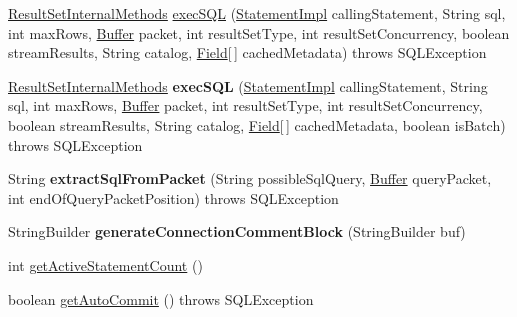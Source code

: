 \begin{DoxyCompactItemize}
\item 
\mbox{\hyperlink{interfacecom_1_1mysql_1_1jdbc_1_1_result_set_internal_methods}{Result\+Set\+Internal\+Methods}} \mbox{\hyperlink{classcom_1_1mysql_1_1jdbc_1_1_connection_impl_ad757f25d671446b4bf4eec638de7ddce}{exec\+S\+QL}} (\mbox{\hyperlink{classcom_1_1mysql_1_1jdbc_1_1_statement_impl}{Statement\+Impl}} calling\+Statement, String sql, int max\+Rows, \mbox{\hyperlink{classcom_1_1mysql_1_1jdbc_1_1_buffer}{Buffer}} packet, int result\+Set\+Type, int result\+Set\+Concurrency, boolean stream\+Results, String catalog, \mbox{\hyperlink{classcom_1_1mysql_1_1jdbc_1_1_field}{Field}}\mbox{[}$\,$\mbox{]} cached\+Metadata)  throws S\+Q\+L\+Exception 
\item 
\mbox{\label{classcom_1_1mysql_1_1jdbc_1_1_connection_impl_a4c153e32d07757c63a3000d5775b94a8}} 
\mbox{\hyperlink{interfacecom_1_1mysql_1_1jdbc_1_1_result_set_internal_methods}{Result\+Set\+Internal\+Methods}} {\bfseries exec\+S\+QL} (\mbox{\hyperlink{classcom_1_1mysql_1_1jdbc_1_1_statement_impl}{Statement\+Impl}} calling\+Statement, String sql, int max\+Rows, \mbox{\hyperlink{classcom_1_1mysql_1_1jdbc_1_1_buffer}{Buffer}} packet, int result\+Set\+Type, int result\+Set\+Concurrency, boolean stream\+Results, String catalog, \mbox{\hyperlink{classcom_1_1mysql_1_1jdbc_1_1_field}{Field}}\mbox{[}$\,$\mbox{]} cached\+Metadata, boolean is\+Batch)  throws S\+Q\+L\+Exception 
\item 
\mbox{\label{classcom_1_1mysql_1_1jdbc_1_1_connection_impl_a943c2853f348567b58595695c10d085c}} 
String {\bfseries extract\+Sql\+From\+Packet} (String possible\+Sql\+Query, \mbox{\hyperlink{classcom_1_1mysql_1_1jdbc_1_1_buffer}{Buffer}} query\+Packet, int end\+Of\+Query\+Packet\+Position)  throws S\+Q\+L\+Exception 
\item 
\mbox{\label{classcom_1_1mysql_1_1jdbc_1_1_connection_impl_a0099ef4fea3b3d4c573b72f257d01f71}} 
String\+Builder {\bfseries generate\+Connection\+Comment\+Block} (String\+Builder buf)
\item 
int \mbox{\hyperlink{classcom_1_1mysql_1_1jdbc_1_1_connection_impl_ab89e48067b2d2b3e3257896c5bed6706}{get\+Active\+Statement\+Count}} ()
\item 
boolean \mbox{\hyperlink{classcom_1_1mysql_1_1jdbc_1_1_connection_impl_a29b7b5781a8ac3876760aa1d98b8d25a}{get\+Auto\+Commit}} ()  throws S\+Q\+L\+Exception 

\end{DoxyCompactItemize}
